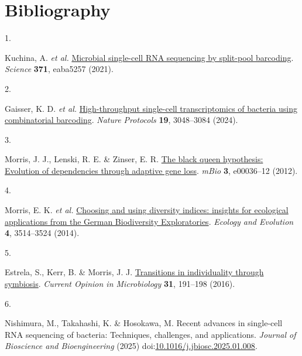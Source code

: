 \documentclass[
  11pt,
  a4paper,
]{report}
\newlength{\cslhangindent}
\newlength{\csllabelwidth}
\newenvironment{CSLReferences}[2] %
 {\begin{list}{}{%
  \setlength{\itemindent}{0pt}
  \setlength{\leftmargin}{0pt}
  \setlength{\parsep}{0pt}
  \ifodd #1
   \setlength{\leftmargin}{\cslhangindent}
   \setlength{\itemindent}{-1\cslhangindent}
  \fi
  \setlength{\itemsep}{#2\baselineskip}}}
 {\end{list}}
\newcommand{\CSLLeftMargin}[1]{\parbox[t]{\csllabelwidth}{\strut#1\strut}}
\newcommand{\CSLRightInline}[1]{\parbox[t]{\linewidth - \csllabelwidth}{\strut#1\strut}}
\begin{document}

\chapter*{Bibliography}\label{bibliography}


\label{refs}
\begin{CSLReferences}{0}{0}
\CSLLeftMargin{1. }%
\CSLRightInline{Kuchina, A. \emph{et al.}
\href{https://doi.org/10.1126/science.aba5257}{Microbial single-cell RNA
sequencing by split-pool barcoding}. \emph{Science} \textbf{371},
eaba5257 (2021).}

\CSLLeftMargin{2. }%
\CSLRightInline{Gaisser, K. D. \emph{et al.}
\href{https://doi.org/10.1038/s41596-024-01007-w}{High-throughput
single-cell transcriptomics of bacteria using combinatorial barcoding}.
\emph{Nature Protocols} \textbf{19}, 3048--3084 (2024).}

\CSLLeftMargin{3. }%
\CSLRightInline{Morris, J. J., Lenski, R. E. \& Zinser, E. R.
\href{https://doi.org/10.1128/mBio.00036-12}{The black queen hypothesis:
Evolution of dependencies through adaptive gene loss}. \emph{mBio}
\textbf{3}, e00036--12 (2012).}

\CSLLeftMargin{4. }%
\CSLRightInline{Morris, E. K. \emph{et al.}
\href{https://doi.org/10.1002/ece3.1155}{Choosing and using diversity
indices: insights for ecological applications from the German
Biodiversity Exploratories}. \emph{Ecology and Evolution} \textbf{4},
3514--3524 (2014).}

\CSLLeftMargin{5. }%
\CSLRightInline{Estrela, S., Kerr, B. \& Morris, J. J.
\href{https://doi.org/10.1016/j.mib.2016.04.007}{Transitions in
individuality through symbiosis}. \emph{Current Opinion in Microbiology}
\textbf{31}, 191--198 (2016).}

\CSLLeftMargin{6. }%
\CSLRightInline{Nishimura, M., Takahashi, K. \& Hosokawa, M. Recent
advances in single-cell RNA sequencing of bacteria: Techniques,
challenges, and applications. \emph{Journal of Bioscience and
Bioengineering} (2025)
doi:\href{https://doi.org/10.1016/j.jbiosc.2025.01.008}{10.1016/j.jbiosc.2025.01.008}.}


\end{CSLReferences}
\end{document}
